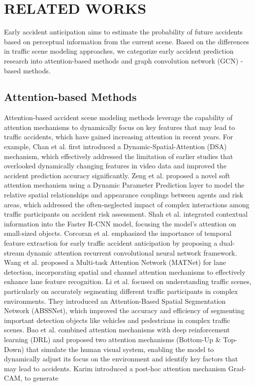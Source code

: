\section{RELATED WORKS}
\label{sec2}

Early accident anticipation aims to estimate the probability of future accidents based on perceptual information from the current scene. Based on the differences in traffic scene modeling approaches, we categorize early accident prediction research into attention-based methods and graph convolution network (GCN) -based methods.
\subsection{Attention-based Methods}

Attention-based accident scene modeling methods \cite{karim2022dynamic,fatima2021global,chan2017anticipating,bao2020uncertainty,zeng2017agent,shah2018cadp,corcoran2019traffic,wang2020multitask,li2021abssnet,karim2022toward,dosovitskiy2020image,kang2022vision,karim2023attention} leverage the capability of attention mechanisms to dynamically focus on key features that may lead to traffic accidents, which have gained increasing attention in recent years. For example, Chan et al. \cite{chan2017anticipating} first introduced a Dynamic-Spatial-Attention (DSA) mechanism, which effectively addressed the limitation of earlier studies that overlooked dynamically changing features in video data and improved the accident prediction accuracy significantly. Zeng et al. \cite{zeng2017agent} proposed a novel soft attention mechanism using a Dynamic Parameter Prediction layer to model the relative spatial relationships and appearance couplings between agents and risk areas, which addressed the often-neglected impact of complex interactions among traffic participants on accident risk assessment. Shah et al. \cite{shah2018cadp} integrated contextual information into the Faster R-CNN model, focusing the model's attention on small-sized objects. Corcoran et al. \cite{corcoran2019traffic} emphasized the importance of temporal feature extraction for early traffic accident anticipation by proposing a dual-stream dynamic attention recurrent convolutional neural network framework. Wang et al. \cite{wang2020multitask} proposed a Multi-task Attention Network (MATNet) for lane detection, incorporating spatial and channel attention mechanisms to effectively enhance lane feature recognition. Li et al. \cite{li2021abssnet} focused on understanding traffic scenes, particularly on accurately segmenting different traffic participants in complex environments. They introduced an Attention-Based Spatial Segmentation Network (ABSSNet), which improved the accuracy and efficiency of segmenting important detection objects like vehicles and pedestrians in complex traffic scenes. Bao et al. \cite{bao2020uncertainty} combined attention mechanisms with deep reinforcement learning (DRL) and proposed two attention mechanisms (Bottom-Up \& Top-Down) that simulate the human visual system, enabling the model to dynamically adjust its focus on the environment and identify key factors that may lead to accidents. Karim \cite{karim2022toward} introduced a post-hoc attention mechanism Grad-CAM, to generate 